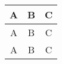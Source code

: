 



\begin{tabular}{||c || c || c ||}
	\hline\hline
	A & B & C \\
	\hline\hline
	A & B & C \\
	\hline\hline
	A & B & C \\
	\hline\hline
\end{tabular}


